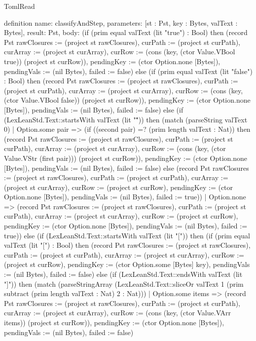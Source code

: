 \begin{lexlean}{TomlRead}
\begin{semanticmodule}
definition{
  name: classifyAndStep,
  parameters: [st : Pst, key : Bytes, valText : Bytes],
  result: Pst,
  body:
   (if (prim equal valText (lit "true") : Bool) then
      (record Pst {rawClosures := (project st rawClosures), curPath := (project st curPath), curArray := (project st curArray), curRow := (cons (key, (ctor Value.VBool true)) (project st curRow)), pendingKey := (ctor Option.none [Bytes]), pendingVals := (nil Bytes), failed := false})
    else (if (prim equal valText (lit "false") : Bool) then
      (record Pst {rawClosures := (project st rawClosures), curPath := (project st curPath), curArray := (project st curArray), curRow := (cons (key, (ctor Value.VBool false)) (project st curRow)), pendingKey := (ctor Option.none [Bytes]), pendingVals := (nil Bytes), failed := false})
    else (if (LexLeanStd.Text::startsWith valText (lit "\"")) then
      (match (parseString valText 0)
        | Option.some pair => (if ((second pair) =? (prim length valText : Nat)) then
            (record Pst {rawClosures := (project st rawClosures), curPath := (project st curPath), curArray := (project st curArray), curRow := (cons (key, (ctor Value.VStr (first pair))) (project st curRow)), pendingKey := (ctor Option.none [Bytes]), pendingVals := (nil Bytes), failed := false})
          else (record Pst {rawClosures := (project st rawClosures), curPath := (project st curPath), curArray := (project st curArray), curRow := (project st curRow), pendingKey := (ctor Option.none [Bytes]), pendingVals := (nil Bytes), failed := true}))
        | Option.none => (record Pst {rawClosures := (project st rawClosures), curPath := (project st curPath), curArray := (project st curArray), curRow := (project st curRow), pendingKey := (ctor Option.none [Bytes]), pendingVals := (nil Bytes), failed := true}))
    else (if (LexLeanStd.Text::startsWith valText (lit "[")) then
      (if (prim equal valText (lit "[") : Bool) then
         (record Pst {rawClosures := (project st rawClosures), curPath := (project st curPath), curArray := (project st curArray), curRow := (project st curRow), pendingKey := (ctor Option.some [Bytes] key), pendingVals := (nil Bytes), failed := false})
       else (if (LexLeanStd.Text::endsWith valText (lit "]")) then
         (match (parseStringArray (LexLeanStd.Text::sliceOr valText 1 (prim subtract (prim length valText : Nat) 2 : Nat)))
           | Option.some items => (record Pst {rawClosures := (project st rawClosures), curPath := (project st curPath), curArray := (project st curArray), curRow := (cons (key, (ctor Value.VArr items)) (project st curRow)), pendingKey := (ctor Option.none [Bytes]), pendingVals := (nil Bytes), failed := false})
}
\end{semanticmodule}
\end{lexlean}
